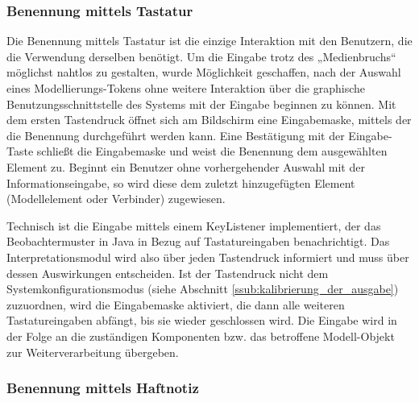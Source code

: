 \subsubsection{Benennung mittels Tastatur} %
\label{ssub:benennung_mittels_tastatur}

Die Benennung mittels Tastatur ist die einzige Interaktion mit den Benutzern, die die Verwendung derselben benötigt. Um die Eingabe trotz des „Medienbruchs“ möglichst nahtlos zu gestalten, wurde Möglichkeit geschaffen, nach der Auswahl eines Modellierungs-Tokens ohne weitere Interaktion über die graphische Benutzungsschnittstelle des Systems mit der Eingabe beginnen zu können. Mit dem ersten Tastendruck öffnet sich am Bildschirm eine Eingabemaske, mittels der die Benennung durchgeführt werden kann. Eine Bestätigung mit der Eingabe-Taste schließt die Eingabemaske und weist die Benennung dem ausgewählten Element zu. Beginnt ein Benutzer ohne vorhergehender Auswahl mit der Informationseingabe, so wird diese dem zuletzt hinzugefügten Element (Modellelement oder Verbinder) zugewiesen.

Technisch ist die Eingabe mittels einem KeyListener implementiert, der das Beobachtermuster \citep{Gamma95} in Java in Bezug auf Tastatureingaben benachrichtigt. Das Interpretationsmodul wird also über jeden Tastendruck informiert und muss über dessen Auswirkungen entscheiden. Ist der Tastendruck nicht dem Systemkonfigurationsmodus (siehe Abschnitt \ref{ssub:kalibrierung_der_ausgabe}) zuzuordnen, wird die Eingabemaske aktiviert, die dann alle weiteren Tastatureingaben abfängt, bis sie wieder geschlossen wird. Die Eingabe wird in der Folge an die zuständigen Komponenten bzw. das betroffene Modell-Objekt zur Weiterverarbeitung übergeben.


\subsubsection{Benennung mittels Haftnotiz} %
\label{ssub:benennung_mittels_haftnotiz}

